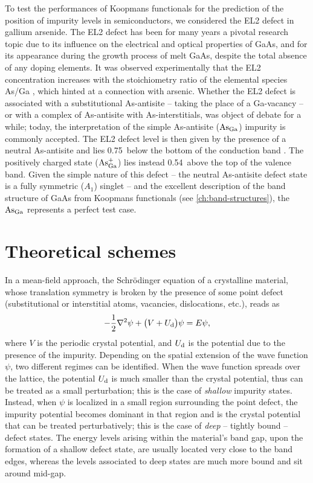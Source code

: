 To test the performances of Koopmans functionals for the prediction of the position of impurity levels in semiconductors, we considered the EL2 defect in gallium arsenide. The EL2 defect has been for many years a pivotal research topic due to its influence on the electrical and optical properties of GaAs, and for its appearance during the growth process of melt GaAs, despite the total absence of any doping elements. It was observed experimentally that the EL2 concentration increases with the stoichiometry ratio of the elemental species As/Ga \cite{kaminska_el2_1987}, which hinted at a connection with arsenic. Whether the EL2 defect is associated with a substitutional As-antisite -- taking the place of a Ga-vacancy -- or with a complex of As-antisite with As-interstitials, was object of debate for a while; today, the interpretation of the simple As-antisite ($\rm As_{Ga}$) impurity is commonly accepted. The EL2 defect level is then given by the presence of a neutral As-antisite and lies 0.75~\mev below the bottom of the conduction band \cite{kaminska_el2_1987,dabrowski_isolated_1989,komsa_assessing_2011}. The positively charged state ($\rm As_{Ga}^+$) lies instead 0.54~\mev above the top of the valence band. Given the simple nature of this defect -- the neutral As-antisite defect state is a fully symmetric ($A_1$) singlet -- and the excellent description of the band structure of GaAs from Koopmans functionals (see \cref{ch:band-structures}), the $\rm As_{Ga}$ represents a perfect test case.

\section{Theoretical schemes\label{sec:theory-defects}}
In a mean-field approach, the Schr\"{o}dinger equation of a crystalline material, whose translation symmetry is broken by the presence of some point defect (substitutional or interstitial atoms, vacancies, dislocations, etc.), reads as
%
\begin{equation}
    -\frac{1}{2} \nabla^2 \psi + \big( V + U_{\rm d } \big) \psi = E \psi ,
    \label{eq:schrodinger-eq-defects}
\end{equation}
%
where $V$ is the periodic crystal potential, and $U_{\rm d}$ is the potential due to the presence of the impurity. Depending on the spatial extension of the wave function $\psi$, two different regimes can be identified. When the wave function spreads over the lattice, the potential $U_{\rm d}$ is much smaller than the crystal potential, thus can be treated as a small perturbation; this is the case of \emph{shallow} impurity states. Instead, when $\psi$ is localized in a small region surrounding the point defect, the impurity potential becomes dominant in that region and is the crystal potential that can be treated perturbatively; this is the case of \emph{deep} -- tightly bound -- defect states. The energy levels arising within the material's band gap, upon the formation of a shallow defect state, are usually located very close to the band edges, whereas the levels associated to deep states are much more bound and sit around mid-gap.

